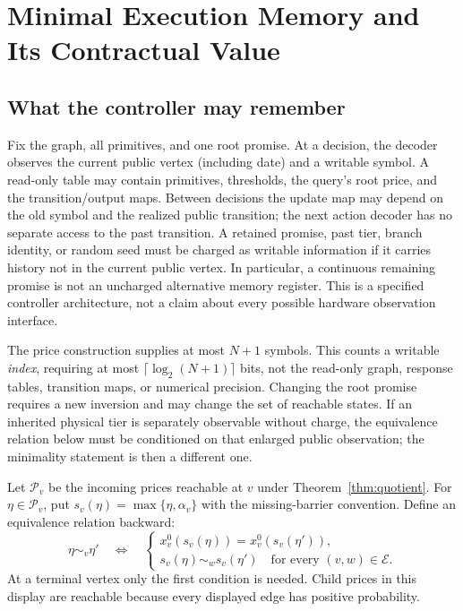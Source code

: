\section{Minimal Execution Memory and Its Contractual Value}\label{sec:memory}
\subsection{What the controller may remember}
Fix the graph, all primitives, and one root promise. At a decision, the decoder observes the current public vertex (including date) and a writable symbol. A read-only table may contain primitives, thresholds, the query's root price, and the transition/output maps. Between decisions the update map may depend on the old symbol and the realized public transition; the next action decoder has no separate access to the past transition. A retained promise, past tier, branch identity, or random seed must be charged as writable information if it carries history not in the current public vertex. In particular, a continuous remaining promise is not an uncharged alternative memory register. This is a specified controller architecture, not a claim about every possible hardware observation interface.

The price construction supplies at most $N+1$ symbols. This counts a writable \emph{index}, requiring at most $\lceil\log_2(N+1)\rceil$ bits, not the read-only graph, response tables, transition maps, or numerical precision. Changing the root promise requires a new inversion and may change the set of reachable states. If an inherited physical tier is separately observable without charge, the equivalence relation below must be conditioned on that enlarged public observation; the minimality statement is then a different one.

Let $\mathcal P_v$ be the incoming prices reachable at $v$ under Theorem~\ref{thm:quotient}. For $\eta\in\mathcal P_v$, put $s_v(\eta)=\max\{\eta,\alpha_v\}$ with the missing-barrier convention. Define an equivalence relation backward:
\begin{equation}\label{eq:behavior}
 \eta\sim_v\eta'\quad\Longleftrightarrow\quad
 \begin{cases}
 x_v^0(s_v(\eta))=x_v^0(s_v(\eta')),\\
 s_v(\eta)\sim_w s_v(\eta')\quad\text{for every }(v,w)\in\mathcal E.
 \end{cases}
\end{equation}
At a terminal vertex only the first condition is needed. Child prices in this display are reachable because every displayed edge has positive probability.


